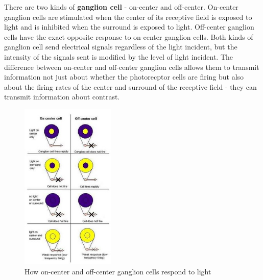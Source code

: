 \documentclass{article}
\begin{document}
	\par There are two kinds of \textbf{ganglion cell} - on-center and off-center. On-center ganglion cells are stimulated when the center of its receptive field is exposed to light and is inhibited when the surround is exposed to light. Off-center ganglion cells have the exact opposite response to on-center ganglion cells. Both kinds of ganglion cell send electrical signals regardless of the light incident, but the intensity of the signals sent is modified by the level of light incident. The difference between on-center and off-center ganglion cells allows them to transmit information not just about whether the photorecptor cells are firing but also about the firing rates of the center and surround of the receptive field - they can transmit information about contrast.
	
	\begin{figure}[ht]
		\centering
		\includegraphics[width=0.4\textwidth]{on_off_ganglion_cells}
		\caption{How on-center and off-center ganglion cells respond to light}
		\label{fig:on off ganglion}
	\end{figure}
	
\end{document}
